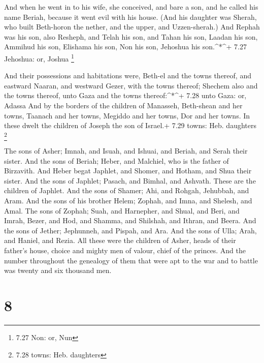  And when he went in to his wife, she conceived, and bare a
son, and he called his name Beriah, because it went evil with his house.
 (And his daughter was Sherah, who built Beth-horon the
nether, and the upper, and Uzzen-sherah.)  And Rephah was
his son, also Resheph, and Telah his son, and Tahan his son,
 Laadan his son, Ammihud his son, Elishama his son,
 Non his son, Jehoshua his son.\^{}*\^{}+ 7.27 Jehoshua:
or, Joshua \footnote{7.27 Non: or, Nun}

 And their possessions and habitations were, Beth-el and
the towns thereof, and eastward Naaran, and westward Gezer, with the
towns thereof; Shechem also and the towns thereof, unto Gaza and the
towns thereof:\^{}*\^{}+ 7.28 unto Gaza: or, Adassa  And by
the borders of the children of Manasseh, Beth-shean and her towns,
Taanach and her towns, Megiddo and her towns, Dor and her towns. In
these dwelt the children of Joseph the son of Israel.+ 7.29 towns: Heb.
daughters \footnote{7.28 towns: Heb. daughters}

 The sons of Asher; Imnah, and Isuah, and Ishuai, and
Beriah, and Serah their sister.  And the sons of Beriah;
Heber, and Malchiel, who is the father of Birzavith.  And
Heber begat Japhlet, and Shomer, and Hotham, and Shua their sister.
 And the sons of Japhlet; Pasach, and Bimhal, and Ashvath.
These are the children of Japhlet.  And the sons of Shamer;
Ahi, and Rohgah, Jehubbah, and Aram.  And the sons of his
brother Helem; Zophah, and Imna, and Shelesh, and Amal. 
The sons of Zophah; Suah, and Harnepher, and Shual, and Beri, and Imrah,
 Bezer, and Hod, and Shamma, and Shilshah, and Ithran, and
Beera.  And the sons of Jether; Jephunneh, and Pispah, and
Ara.  And the sons of Ulla; Arah, and Haniel, and Rezia.
 All these were the children of Asher, heads of their
father's house, choice and mighty men of valour, chief of the princes.
And the number throughout the genealogy of them that were apt to the war
and to battle was twenty and six thousand men.

\hypertarget{section-7}{%
\section{8}\label{section-7}}

